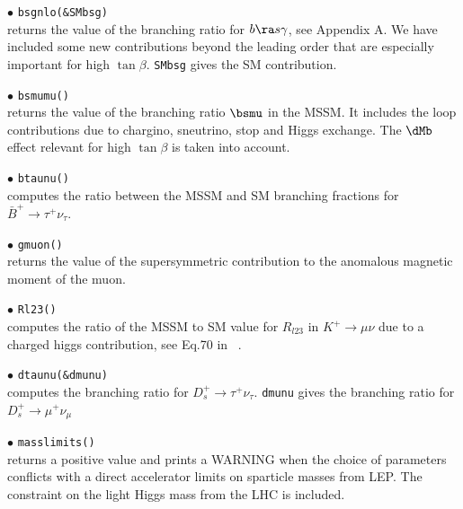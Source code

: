 \documentclass[12pt,a4paper]{article}
\begin{document}
{\noi$\bullet$ \verb|bsgnlo(&SMbsg)|\\ returns the value of the branching ratio for  $b\ra s\gamma$, see Appendix A. 
We have included some new contributions beyond the leading order that are
especially important for high $\tan\beta$. \verb|SMbsg| gives the SM contribution.

\noi$\bullet$ \verb|bsmumu()|\\ returns the value of the branching ratio $\bsmu$ in the
MSSM.
It includes the loop contributions
due to chargino, sneutrino, stop and Higgs exchange. The $\dMb$ 
effect relevant for high $\tan \beta$ is taken into account.

\noi$\bullet$ \verb|btaunu()|\\
computes the ratio between the MSSM and SM branching fractions for $\bar{B}^+\rightarrow\tau^+\nu_\tau$. 


\noi$\bullet$ \verb|gmuon()|\\
returns the value of the supersymmetric contribution to the
anomalous magnetic moment of the muon.

\noi$\bullet$ \verb|Rl23()|\\
computes the ratio of the MSSM to SM value for $R_{l23}$ in $K^+\rightarrow \mu\nu$  due to a  charged higgs contribution, see Eq.70 in ~\cite{Belanger:2013oya}. 

\noi$\bullet$ \verb|dtaunu(&dmunu)|\\
computes the branching ratio  for ${D}_s^+\rightarrow\tau^+\nu_\tau$. \verb|dmunu| 
gives  the branching ratio  for ${D}_s^+\rightarrow\mu^+\nu_\mu$

 
\noi$\bullet$ \verb|masslimits()|\\
returns a positive value  and
 prints a WARNING when the choice of parameters conflicts with a
direct accelerator limits on sparticle masses from LEP.
The constraint on the light Higgs mass from the LHC is included.  

}
\end{document}
